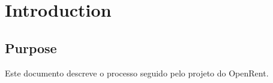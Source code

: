 \section*{Introduction}







\subsection*{Purpose}


Este documento descreve o processo seguido pelo projeto do OpenRent.


